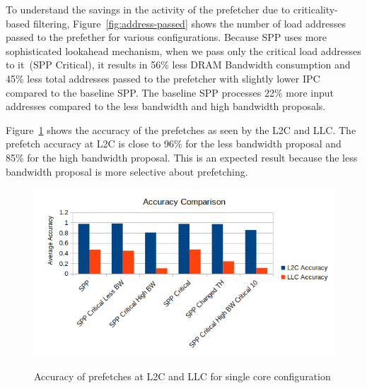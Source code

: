 To understand the savings in the activity of the prefetcher due to criticality-based filtering, Figure~\ref{fig:address-passed} shows the number of load addresses passed to the prefether for various configurations. 
Because SPP uses more sophisticated lookahead mechanism, when we pass only the critical load addresses to it~(SPP Critical), it results in 56\%  less DRAM Bandwidth consumption and 45\% less total addresses passed to the prefetcher with slightly lower IPC compared to the baseline SPP. The baseline SPP processes 22\% more input addresses compared to the less bandwidth and high bandwidth proposals.

Figure~\ref{fig:accuracy-single-core} shows the accuracy of the prefetches as seen by the L2C and LLC.
The prefetch accuracy at L2C is close to 96\% for the less bandwidth proposal and 85\% for the high bandwidth proposal. This is an expected result because the less bandwidth proposal is more selective about prefetching.
\begin{figure}[H]
{\includegraphics[scale=0.7]{images/Accuracy Comparison_single.png}}
\caption{Accuracy of prefetches at L2C and LLC for single core configuration}
\label{fig:accuracy-single-core}
\end{figure}

